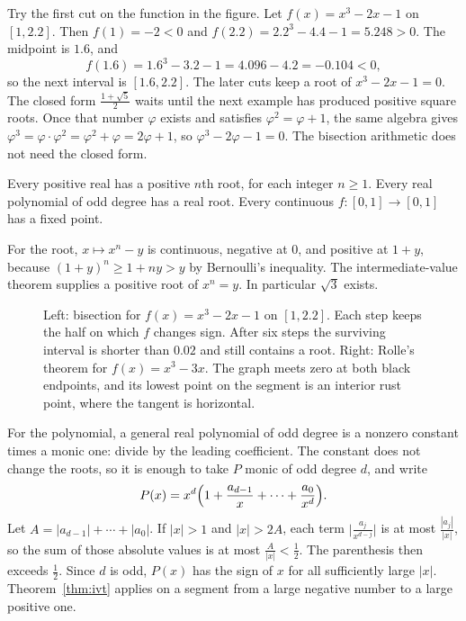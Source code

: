 Try the first cut on the function in the figure. Let $f(x)=x^3-2x-1$ on $[1,2.2]$. Then $f(1)=-2<0$ and $f(2.2)=2.2^3-4.4-1=5.248>0$. The midpoint is $1.6$, and
\[
f(1.6)=1.6^3-3.2-1=4.096-4.2=-0.104<0,
\]
so the next interval is $[1.6,2.2]$. The later cuts keep a root of $x^3-2x-1=0$. The closed form $\frac{1+\sqrt5}2$ waits until the next example has produced positive square roots. Once that number $\varphi$ exists and satisfies $\varphi^2=\varphi+1$, the same algebra gives $\varphi^3=\varphi\cdot\varphi^2=\varphi^2+\varphi=2\varphi+1$, so $\varphi^3-2\varphi-1=0$. The bisection arithmetic does not need the closed form.

\begin{examplex}
Every positive real has a positive $n$th root, for each integer $n\ge1$. Every real polynomial of odd degree has a real root. Every continuous $f:[0,1]\to[0,1]$ has a fixed point.
\end{examplex}

For the root, $x\mapsto x^n-y$ is continuous, negative at $0$, and positive at $1+y$, because $(1+y)^n\ge1+ny>y$ by Bernoulli's inequality. The intermediate-value theorem supplies a positive root of $x^n=y$. In particular $\sqrt3$ exists.

\begin{figure}[ht]
\centering
{}
\caption{Left: bisection for $f(x)=x^3-2x-1$ on $[1,2.2]$. Each step keeps the half on which $f$ changes sign. After six steps the surviving interval is shorter than $0.02$ and still contains a root. Right: Rolle's theorem for $f(x)=x^3-3x$. The graph meets zero at both black endpoints, and its lowest point on the segment is an interior rust point, where the tangent is horizontal.}
\label{fig:bisection}
\end{figure}

For the polynomial, a general real polynomial of odd degree is a nonzero constant times a monic one: divide by the leading coefficient. The constant does not change the roots, so it is enough to take $P$ monic of odd degree $d$, and write
\[
P(x)=x^d\Bigl(1+\frac{a_{d-1}}x+\cdots+\frac{a_0}{x^d}\Bigr).
\]
Let $A=|a_{d-1}|+\cdots+|a_0|$. If $|x|>1$ and $|x|>2A$, each term $\bigl|\frac{a_j}{x^{d-j}}\bigr|$ is at most $\frac{|a_j|}{|x|}$, so the sum of those absolute values is at most $\frac A{|x|}<\frac12$. The parenthesis then exceeds $\frac12$. Since $d$ is odd, $P(x)$ has the sign of $x$ for all sufficiently large $|x|$. Theorem~\ref{thm:ivt} applies on a segment from a large negative number to a large positive one.


